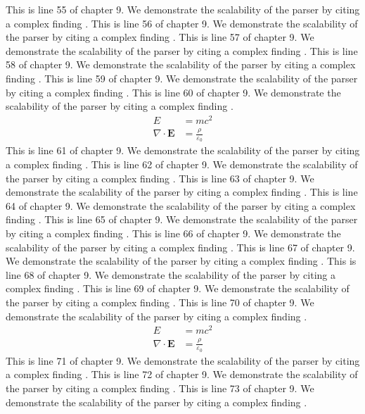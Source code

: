 This is line 55 of chapter 9. We demonstrate the scalability of the parser by citing a complex finding \cite{ref9_55}.
This is line 56 of chapter 9. We demonstrate the scalability of the parser by citing a complex finding \cite{ref9_56}.
This is line 57 of chapter 9. We demonstrate the scalability of the parser by citing a complex finding \cite{ref9_57}.
This is line 58 of chapter 9. We demonstrate the scalability of the parser by citing a complex finding \cite{ref9_58}.
This is line 59 of chapter 9. We demonstrate the scalability of the parser by citing a complex finding \cite{ref9_59}.
This is line 60 of chapter 9. We demonstrate the scalability of the parser by citing a complex finding \cite{ref9_60}.
\begin{align*}
  E &= mc^2 \\
  \nabla \cdot \mathbf{E} &= \frac{\rho}{\varepsilon_0}
\end{align*}
This is line 61 of chapter 9. We demonstrate the scalability of the parser by citing a complex finding \cite{ref9_61}.
This is line 62 of chapter 9. We demonstrate the scalability of the parser by citing a complex finding \cite{ref9_62}.
This is line 63 of chapter 9. We demonstrate the scalability of the parser by citing a complex finding \cite{ref9_63}.
This is line 64 of chapter 9. We demonstrate the scalability of the parser by citing a complex finding \cite{ref9_64}.
This is line 65 of chapter 9. We demonstrate the scalability of the parser by citing a complex finding \cite{ref9_65}.
This is line 66 of chapter 9. We demonstrate the scalability of the parser by citing a complex finding \cite{ref9_66}.
This is line 67 of chapter 9. We demonstrate the scalability of the parser by citing a complex finding \cite{ref9_67}.
This is line 68 of chapter 9. We demonstrate the scalability of the parser by citing a complex finding \cite{ref9_68}.
This is line 69 of chapter 9. We demonstrate the scalability of the parser by citing a complex finding \cite{ref9_69}.
This is line 70 of chapter 9. We demonstrate the scalability of the parser by citing a complex finding \cite{ref9_70}.
\begin{align*}
  E &= mc^2 \\
  \nabla \cdot \mathbf{E} &= \frac{\rho}{\varepsilon_0}
\end{align*}
This is line 71 of chapter 9. We demonstrate the scalability of the parser by citing a complex finding \cite{ref9_71}.
This is line 72 of chapter 9. We demonstrate the scalability of the parser by citing a complex finding \cite{ref9_72}.
This is line 73 of chapter 9. We demonstrate the scalability of the parser by citing a complex finding \cite{ref9_73}.
